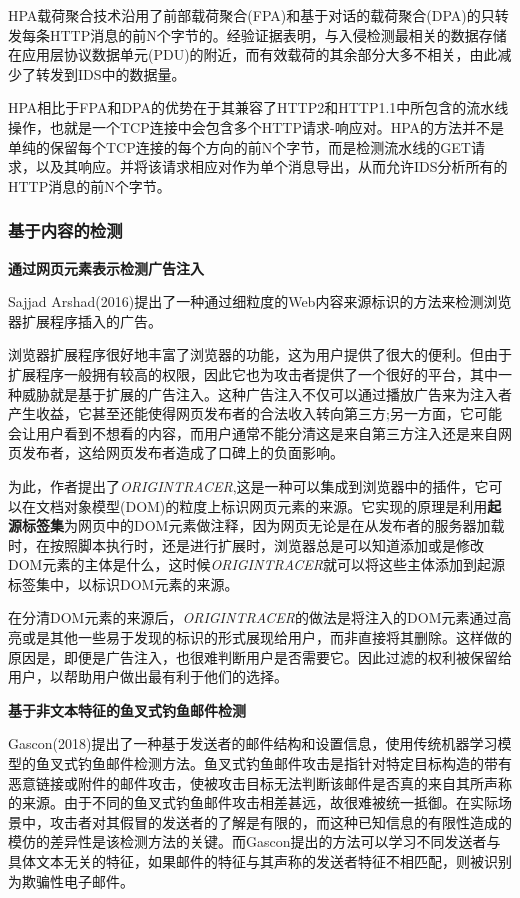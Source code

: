 \documentclass[12pt]{article} %
\begin{document}
HPA载荷聚合技术沿用了前部载荷聚合(FPA)和基于对话的载荷聚合(DPA)的只转发每条HTTP消息的前N个字节的。经验证据表明，与入侵检测最相关的数据存储在应用层协议数据单元(PDU)的附近，而有效载荷的其余部分大多不相关，由此减少了转发到IDS中的数据量。

HPA相比于FPA和DPA的优势在于其兼容了HTTP2和HTTP1.1中所包含的流水线操作，也就是一个TCP连接中会包含多个HTTP请求-响应对。HPA的方法并不是单纯的保留每个TCP连接的每个方向的前N个字节，而是检测流水线的GET请求，以及其响应。并将该请求相应对作为单个消息导出，从而允许IDS分析所有的HTTP消息的前N个字节。
\subsubsection{基于内容的检测}

\label{content}

\textbf{通过网页元素表示检测广告注入}

Sajjad Arshad(2016)\cite{Arshad}提出了一种通过细粒度的Web内容来源标识的方法来检测浏览器扩展程序插入的广告。

浏览器扩展程序很好地丰富了浏览器的功能，这为用户提供了很大的便利。但由于扩展程序一般拥有较高的权限，因此它也为攻击者提供了一个很好的平台，其中一种威胁就是基于扩展的广告注入。这种广告注入不仅可以通过播放广告来为注入者产生收益，它甚至还能使得网页发布者的合法收入转向第三方;另一方面，它可能会让用户看到不想看的内容，而用户通常不能分清这是来自第三方注入还是来自网页发布者，这给网页发布者造成了口碑上的负面影响。 %

为此，作者提出了\emph{ORIGINTRACER},这是一种可以集成到浏览器中的插件，它可以在文档对象模型(DOM)的粒度上标识网页元素的来源。它实现的原理是利用\textbf{起源标签集}为网页中的DOM元素做注释，因为网页无论是在从发布者的服务器加载时，在按照脚本执行时，还是进行扩展时，浏览器总是可以知道添加或是修改DOM元素的主体是什么，这时候\emph{ORIGINTRACER}就可以将这些主体添加到起源标签集中，以标识DOM元素的来源。

在分清DOM元素的来源后，\emph{ORIGINTRACER}的做法是将注入的DOM元素通过高亮或是其他一些易于发现的标识的形式展现给用户，而非直接将其删除。这样做的原因是，即便是广告注入，也很难判断用户是否需要它。因此过滤的权利被保留给用户，以帮助用户做出最有利于他们的选择。

\textbf{基于非文本特征的鱼叉式钓鱼邮件检测}

Gascon(2018)\cite{Gascon}提出了一种基于发送者的邮件结构和设置信息，使用传统机器学习模型的鱼叉式钓鱼邮件检测方法。鱼叉式钓鱼邮件攻击是指针对特定目标构造的带有恶意链接或附件的邮件攻击，使被攻击目标无法判断该邮件是否真的来自其所声称的来源。由于不同的鱼叉式钓鱼邮件攻击相差甚远，故很难被统一抵御。在实际场景中，攻击者对其假冒的发送者的了解是有限的，而这种已知信息的有限性造成的模仿的差异性是该检测方法的关键。而Gascon提出的方法可以学习不同发送者与具体文本无关的特征，如果邮件的特征与其声称的发送者特征不相匹配，则被识别为欺骗性电子邮件。
\end{document}
